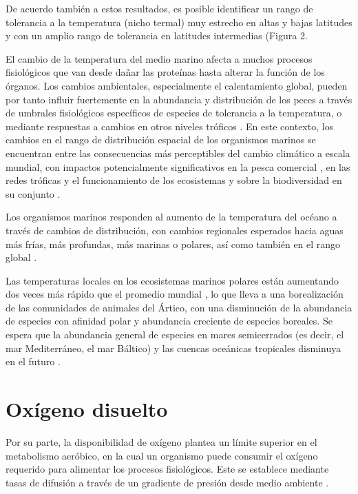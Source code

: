 \documentclass{umagthesis}
\begin{document}
De acuerdo también a estos resultados, es posible identificar un rango de tolerancia a la temperatura (nicho termal) muy estrecho en altas y bajas latitudes y con un amplio rango de tolerancia en latitudes intermedias (Figura 2.

El cambio de la temperatura del medio marino afecta a muchos procesos fisiológicos que van desde dañar las proteínas hasta alterar la función de los órganos. Los cambios ambientales, especialmente el calentamiento global, pueden por tanto influir fuertemente en la abundancia y distribución de los peces a través de umbrales fisiológicos específicos de especies de tolerancia a la temperatura, o mediante respuestas a cambios en otros niveles tróficos \autocite{Perry2005,Rijnsdorp2009,Saba2014}. En este contexto, los cambios en el rango de distribución espacial de los organismos marinos se encuentran entre las consecuencias más perceptibles del cambio climático a escala mundial, con impactos potencialmente significativos en la pesca comercial \autocite{Perry2005,Barange2014}, en las redes tróficas y el funcionamiento de los ecosistemas y sobre la biodiversidad en su conjunto \autocite{Pinsky2020}.

Los organismos marinos responden al aumento de la temperatura del océano a través de cambios de distribución, con cambios regionales esperados hacia aguas más frías, más profundas, más marinas o polares, así como también en el rango global \autocite{Cheung2010a,Pinsky2020,Frawley2019}.

Las temperaturas locales en los ecosistemas marinos polares están aumentando dos veces más rápido que el promedio mundial \autocite{IPCC2014}, lo que lleva a una borealización de las comunidades de animales del Ártico, con una disminución de la abundancia de especies con afinidad polar y abundancia creciente de especies boreales. Se espera que la abundancia general de especies en mares semicerrados (es decir, el mar Mediterráneo, el mar Báltico) y las cuencas oceánicas tropicales disminuya en el futuro \autocite{Cheung2013}.

\pagebreak

\hypertarget{oxuxedgeno-disuelto}{%
\section{Oxígeno disuelto}\label{oxuxedgeno-disuelto}}

Por su parte, la disponibilidad de oxígeno plantea un límite superior en el metabolismo aeróbico, en la cual un organismo puede consumir el oxígeno requerido para alimentar los procesos fisiológicos. Este se establece mediante tasas de difusión a través de un gradiente de presión desde medio ambiente \autocite{Duncan2020}.
\end{document}
